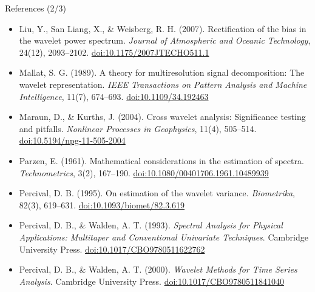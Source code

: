 \begin{frame}{References (2/3)}
\begin{itemize}
    \item Liu, Y., San Liang, X., \& Weisberg, R. H. (2007). Rectification of the bias in the wavelet power spectrum. \textit{Journal of Atmospheric and Oceanic Technology}, 24(12), 2093--2102. \href{https://doi.org/10.1175/2007JTECHO511.1}{doi:10.1175/2007JTECHO511.1}
    \item Mallat, S. G. (1989). A theory for multiresolution signal decomposition: The wavelet representation. \textit{IEEE Transactions on Pattern Analysis and Machine Intelligence}, 11(7), 674--693. \href{https://doi.org/10.1109/34.192463}{doi:10.1109/34.192463}
    \item Maraun, D., \& Kurths, J. (2004). Cross wavelet analysis: Significance testing and pitfalls. \textit{Nonlinear Processes in Geophysics}, 11(4), 505--514. \href{https://doi.org/10.5194/npg-11-505-2004}{doi:10.5194/npg-11-505-2004}
    \item Parzen, E. (1961). Mathematical considerations in the estimation of spectra. \textit{Technometrics}, 3(2), 167--190. \href{https://doi.org/10.1080/00401706.1961.10489939}{doi:10.1080/00401706.1961.10489939}
    \item Percival, D. B. (1995). On estimation of the wavelet variance. \textit{Biometrika}, 82(3), 619--631. \href{https://doi.org/10.1093/biomet/82.3.619}{doi:10.1093/biomet/82.3.619}
    \item Percival, D. B., \& Walden, A. T. (1993). \textit{Spectral Analysis for Physical Applications: Multitaper and Conventional Univariate Techniques}. Cambridge University Press. \href{https://doi.org/10.1017/CBO9780511622762}{doi:10.1017/CBO9780511622762}
    \item Percival, D. B., \& Walden, A. T. (2000). \textit{Wavelet Methods for Time Series Analysis}. Cambridge University Press. \href{https://doi.org/10.1017/CBO9780511841040}{doi:10.1017/CBO9780511841040}
\end{itemize}
\end{frame}

